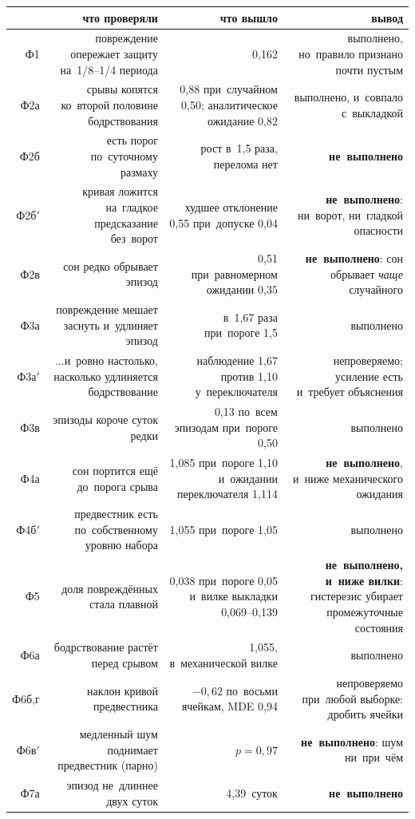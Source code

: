 \documentclass[11pt,a4paper,landscape,twocolumn]{article}
\begin{document}
{\small
\begin{tabular}{@{}R{0.05}R{0.40}R{0.31}R{0.17}@{}}
\toprule
 & \textbf{что проверяли} & \textbf{что вышло} & \textbf{вывод}\\
\midrule
Ф1 & повреждение опережает защиту на~1/8–1/4 периода & 0,162 & выполнено, но~правило признано почти пустым\\
Ф2а & срывы копятся ко~второй половине бодрствования & 0,88 при~случайном 0,50; аналитическое ожидание 0,82 & выполнено, и~совпало с~выкладкой\\
Ф2б & есть порог по~суточному размаху & рост в~1,5 раза, перелома нет & \textbf{не~выполнено}\\
Ф2б$'$ & кривая ложится на~гладкое предсказание без~ворот & худшее отклонение 0,55 при~допуске 0,04 & \textbf{не~выполнено}: ни~ворот, ни~гладкой опасности\\
Ф2в & сон редко обрывает эпизод & 0,51 при~равномерном ожидании 0,35 & \textbf{не~выполнено}: сон обрывает \emph{чаще} случайного\\
Ф3а & повреждение мешает заснуть и~удлиняет эпизод & в~1,67 раза при~пороге 1,5 & выполнено\\
Ф3а$'$ & ...и~ровно настолько, насколько удлиняется бодрствование & наблюдение 1,67 против 1,10 у~переключателя & непроверяемо; усиление есть и~требует объяснения\\
Ф3в & эпизоды короче суток редки & 0,13 по~всем эпизодам при~пороге 0,50 & выполнено\\
Ф4а & сон портится ещё до~порога срыва & 1,085 при~пороге 1,10 и~ожидании переключателя 1,114 & \textbf{не~выполнено}, и~ниже механического ожидания\\
Ф4б$'$ & предвестник есть по~собственному уровню набора & 1,055 при~пороге 1,05 & выполнено\\
Ф5 & доля повреждённых стала плавной & 0,038 при~пороге 0,05 и~вилке выкладки 0,069–0,139 & \textbf{не~выполнено, и~ниже вилки}: гистерезис убирает промежуточные состояния\\
Ф6а & бодрствование растёт перед срывом & 1,055, в~механической вилке & выполнено\\
Ф6б,г & наклон кривой предвестника & $-0{,}62$ по~восьми ячейкам, MDE 0,94 & непроверяемо при~любой выборке: дробить ячейки\\
Ф6в$'$ & медленный шум поднимает предвестник (парно) & $p=0{,}97$ & \textbf{не~выполнено}: шум ни~при~чём\\
Ф7а & эпизод не~длиннее двух суток & 4,39~суток & \textbf{не~выполнено}\\

\end{tabular}}
\end{document}
